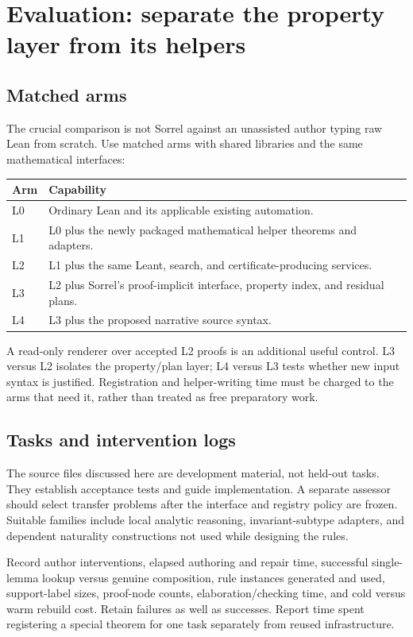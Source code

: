 \documentclass[11pt,a4paper]{article}
\numberwithin{equation}{section}
\theoremstyle{definition}\newtheorem{definition}[theorem]{Definition}
\theoremstyle{remark}\newtheorem{remark}[theorem]{Remark}
\begin{document}
\section{Evaluation: separate the property layer from its helpers}\label{sec:evaluation}

\subsection{Matched arms}
The crucial comparison is not Sorrel against an unassisted author typing raw
Lean from scratch. Use matched arms with shared libraries and the same
mathematical interfaces:
\begin{center}\small
\begin{tabularx}{\textwidth}{@{}P{15mm}Y@{}}\toprule
Arm & Capability\\\midrule
L0 & Ordinary Lean and its applicable existing automation.\\
L1 & L0 plus the newly packaged mathematical helper theorems and adapters.\\
L2 & L1 plus the same Leant, search, and certificate-producing services.\\
L3 & L2 plus Sorrel's proof-implicit interface, property index, and residual plans.\\
L4 & L3 plus the proposed narrative source syntax.\\\bottomrule
\end{tabularx}
\end{center}
A read-only renderer over accepted L2 proofs is an additional useful control.
L3 versus L2 isolates the property/plan layer; L4 versus L3 tests whether new
input syntax is justified. Registration and helper-writing time must be
charged to the arms that need it, rather than treated as free preparatory work.

\subsection{Tasks and intervention logs}
The source files discussed here are development material, not held-out tasks.
They establish acceptance tests and guide implementation. A separate assessor
should select transfer problems after the interface and registry policy are
frozen. Suitable families include local analytic reasoning, invariant-subtype
adapters, and dependent naturality constructions not used while designing the
rules.

Record author interventions, elapsed authoring and repair time, successful
single-lemma lookup versus genuine composition, rule instances generated and
used, support-label sizes, proof-node counts, elaboration/checking time, and
cold versus warm rebuild cost. Retain failures as well as successes. Report
time spent registering a special theorem for one task separately from reused
infrastructure.
\end{document}
